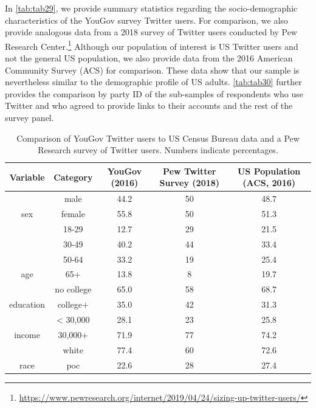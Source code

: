\documentclass[
  12pt,
]{article}
\begin{document}
In \autoref{tab:tab29}, we provide summary statistics regarding the socio-demographic characteristics of the YouGov survey Twitter users. For comparison, we also provide analogous data from a 2018 survey of Twitter users conducted by Pew Research Center.\footnote{\url{https://www.pewresearch.org/internet/2019/04/24/sizing-up-twitter-users/}} Although our population of interest is US Twitter users and not the general US population, we also provide data from the 2016 American Community Survey (ACS) for comparison. These data show that our sample is nevertheless similar to the demographic profile of US adults. \autoref{tab:tab30} further provides the comparison by party ID of the sub-samples of respondents who use Twitter and who agreed to provide links to their accounts and the rest of the survey panel.

\begin{table}[!h]

\caption{\label{tab:unnamed-chunk-4}\label{tab:tab29}Comparison of YouGov Twitter users to US Census Bureau data and a Pew Research survey of Twitter users. Numbers indicate percentages.}
\centering
\fontsize{10}{12}\selectfont
\begin{tabular}[t]{c|c|c|c|c}
\hline
Variable & Category & YouGov (2016) & Pew Twitter Survey (2018) & US Population (ACS, 2016)\\
\hline
 & male & 44.2 & 50 & 48.7\\

\multirow{-2}{*}{\centering\arraybackslash sex} & female & 55.8 & 50 & 51.3\\

\hline
 & 18-29 & 12.7 & 29 & 21.5\\

 & 30-49 & 40.2 & 44 & 33.4\\

 & 50-64 & 33.2 & 19 & 25.4\\

\multirow{-4}{*}{\centering\arraybackslash age} & 65+ & 13.8 & 8 & 19.7\\

\hline
 & no college & 65.0 & 58 & 68.7\\

\multirow{-2}{*}{\centering\arraybackslash education} & college+ & 35.0 & 42 & 31.3\\

\hline
 & < 30,000 & 28.1 & 23 & 25.8\\

\multirow{-2}{*}{\centering\arraybackslash income} & 30,000+ & 71.9 & 77 & 74.2\\

\hline
 & white & 77.4 & 60 & 72.6\\

\multirow{-2}{*}{\centering\arraybackslash race} & poc & 22.6 & 28 & 27.4\\
\hline
\end{tabular}
\end{table}
\end{document}
